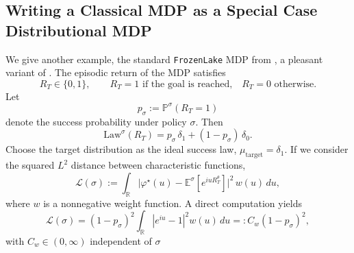 \documentclass[reqno, 11pt]{amsart}%
\newcommand\cL{\mathcal L}
\newcommand\EE{\mathbb E}
\theoremstyle{definition}
\newtheorem{remark}[theorem]{Remark}
\begin{document}
\subsection{Writing a Classical MDP as a Special Case Distributional MDP}
\label{se:forzen_lake}
We give another example, the standard \texttt{FrozenLake} MDP from \cite{towers2025gymnasiumstandardinterfacereinforcement}, a pleasant variant of \cite[Example 3.5]{SuttonBarto}. 
The episodic return of the MDP satisfies
\[
R_T \in \{0,1\},
\qquad
R_T = 1 \text{ if the goal is reached,}
\quad
R_T = 0 \text{ otherwise}.
\]
Let
\[
p_\sigma := \mathbb{P}^\sigma(R_T = 1)
\]
denote the success probability under policy $\sigma$. Then
\[
\mathrm{Law}^\sigma(R_T)
    = p_\sigma\,\delta_1 + (1-p_\sigma)\,\delta_0.
\]
Choose the target distribution as the ideal success law,
$\mu_{\mathrm{target}} = \delta_1.$
If we consider the squared $L^2$ distance between characteristic functions,
\[
\cL(\sigma)
:= \int_{\mathbb{R}}
\big|\varphi^\star(u)-\EE^\sigma[e^{iuR_T^\theta}] \big|^2
\, w(u)\, du,
\]
where $w$ is a nonnegative weight function. A direct computation yields
\[
\cL(\sigma)
= (1 - p_\sigma)^2
\int_{\mathbb{R}} |e^{iu} - 1|^2 w(u)\, du
=: C_w (1 - p_\sigma)^2,
\]
with $C_w \in (0,\infty)$ independent of $\sigma$ 





\end{document}
